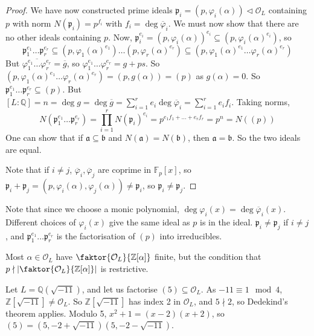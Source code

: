 \begin{proof}
    We have now constructed prime ideals \( \mathfrak p_i = (p, \varphi_i(\alpha)) \triangleleft \mathcal O_L \) containing \( p \) with norm \( N(\mathfrak p_i) = p^{f_i} \) with \( f_i = \deg \overline\varphi_i \).
    We must now show that there are no other ideals containing \( p \).
    Now, \( \mathfrak p_i^{e_i} = (p, \varphi_i(\alpha))^{e_i} \subseteq (p, \varphi_i(\alpha)^{e_i}) \), so
    \[ \mathfrak p_1^{e_1} \dots \mathfrak p_r^{e_r} \subseteq (p, \varphi_1(\alpha)^{e_1}) \dots (p, \varphi_r(\alpha)^{e_r}) \subseteq (p, \varphi_1(\alpha)^{e_1} \dots \varphi_r(\alpha)^{e_r}) \]
    But \( \overline{\varphi_1^{e_1} \dots \varphi_r^{e_r}} = \overline g \), so \( \varphi_1^{e_1} \dots \varphi_r^{e_r} = g + p s \).
    So \( (p, \varphi_1(\alpha)^{e_1} \dots \varphi_r(\alpha)^{e_r}) = (p, g(\alpha)) = (p) \) as \( g(\alpha) = 0 \).
    So \( \mathfrak p_1^{e_1} \dots \mathfrak p_r^{e_r} \subseteq (p) \).
    But \( [L:\mathbb Q] = n = \deg g = \deg \overline g = \sum_{i=1}^r e_i \deg \overline\varphi_i = \sum_{i=1}^r e_i f_i \).
    Taking norms,
    \[ N(\mathfrak p_1^{e_1} \dots \mathfrak p_r^{e_r}) = \prod_{i=1}^r N(\mathfrak p_i)^{e_i} = p^{e_1 f_1 + \dots + e_r f_r} = p^n = N((p)) \]
    One can show that if \( \mathfrak a \subseteq \mathfrak b \) and \( N(\mathfrak a) = N(\mathfrak b) \), then \( \mathfrak a = \mathfrak b \).
    So the two ideals are equal.

    Note that if \( i \neq j \), \( \overline \varphi_i, \overline \varphi_j \) are coprime in \( \mathbb F_p[x] \), so \( \mathfrak p_i + \mathfrak p_j = (p, \varphi_i(\alpha), \varphi_j(\alpha)) \neq \mathfrak p_i \), so \( \mathfrak p_i \neq \mathfrak p_j \).
\end{proof}
Note that since we choose a monic polynomial, \( \deg \varphi_i(x) = \deg \overline \varphi_i(x) \).
Different choices of \( \varphi_i(x) \) give the same ideal as \( p \) is in the ideal.
\( \mathfrak p_i \neq \mathfrak p_j \) if \( i \neq j \), and \( \mathfrak p_1^{e_1} \dots \mathfrak p_r^{e_r} \) is the factorisation of \( (p) \) into irreducibles.
\begin{remark}
    Most \( \alpha \in \mathcal O_L \) have \( \faktor{\mathcal O_L}{\mathbb Z[\alpha]} \) finite, but the condition that \( p \nmid \abs{\faktor{\mathcal O_L}{\mathbb Z[\alpha]}} \) is restrictive.
\end{remark}
\begin{example}
    Let \( L = \mathbb Q(\sqrt{-11}) \), and let us factorise \( (5) \subseteq \mathcal O_L \).
    As \( -11 \equiv 1 \mod 4 \), \( \mathbb Z[\sqrt{-11}] \neq \mathcal O_L \).
    So \( \mathbb Z[\sqrt{-11}] \) has index 2 in \( \mathcal O_L \), and \( 5 \nmid 2 \), so Dedekind's theorem applies.
    Modulo 5, \( x^2 + 1 = (x-2)(x+2) \), so \( (5) = (5, -2 + \sqrt{-11})(5, -2 - \sqrt{-11}) \).
\end{example}
